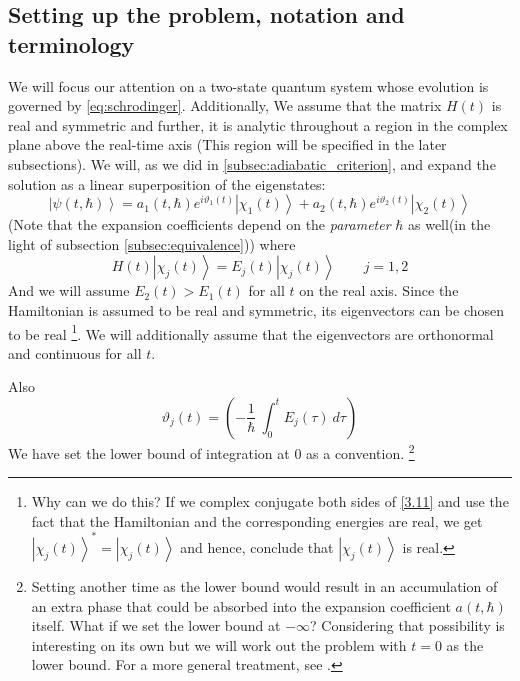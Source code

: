 \documentclass[12pt,a4paper]{article}
\begin{document}
	\subsection{Setting up the problem, notation and terminology}
	\label{subsec:setup}
	We will focus our attention on a two-state quantum system whose evolution is governed by \eqref{eq:schrodinger}. Additionally, We assume that the matrix $H(t)$ is real and symmetric and further, it is analytic throughout a region in the complex plane above the real-time axis (This region will be specified in the later subsections). We will, as we did in \ref{subsec:adiabatic_criterion}, and expand the solution as a linear superposition of the eigenstates:
	\begin{equation}
		\left| \psi(t, \hbar) \right\rangle = a_{1}(t, \hbar) e^{i \vartheta_{1}(t)} \left| \chi_{1}(t) \right\rangle + a_{2}(t, \hbar) e^{i \vartheta_{2}(t)} \left| \chi_{2}(t) \right\rangle
		\label{3.10}
	\end{equation}
	(Note that the expansion coefficients depend on the \emph{parameter} $\hbar$ as well(in the light of subsection \ref{subsec:equivalence})) where 
	\begin{equation}
		H(t) \left| \chi_{j}(t) \right\rangle = E_{j}(t) \left| \chi_{j}(t) \right\rangle
		\label{3.11} \qquad j = 1, 2
	\end{equation}
	And we will assume $E_{2}(t) > E_{1}(t)$ for all $t$ on the real axis. Since the Hamiltonian is assumed to be real and symmetric, its eigenvectors can be chosen to be real \footnote{Why can we do this? If we complex conjugate both sides of \eqref{3.11} and use the fact that the Hamiltonian and the corresponding energies are real, we get $\left| \chi_{j}(t) \right\rangle^{*} = \left| \chi_{j}(t) \right\rangle $ and hence, conclude that $\left| \chi_{j}(t) \right\rangle$ is real.}. We will additionally assume that the eigenvectors are orthonormal and continuous for all $t$.
	
	Also
	\begin{equation}
		\vartheta_{j}(t) = \left(-\frac{1}{\hbar}\ \int_{0}^{t} E_{j}(\tau)\ d\tau \right)
	\end{equation}
	We have set the lower bound of integration at $0$ as a convention. \footnote{Setting another time as the lower bound would result in an accumulation of an extra phase that could be absorbed into the expansion coefficient $a(t, \hbar)$ itself. What if we set the lower bound at $-\infty$? Considering that possibility is interesting on its own but we will work out the problem with $t = 0$ as the lower bound. For a more general treatment, see \cite{JoyeKunzPfister1991}.}
	
\end{document}
